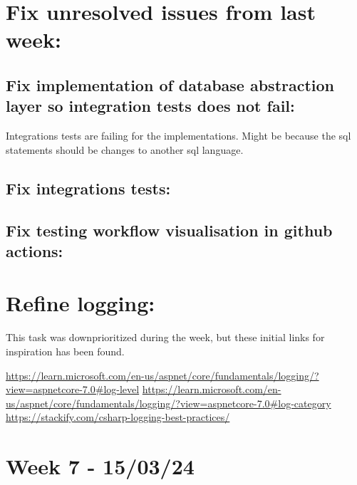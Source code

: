 
\section{Fix unresolved issues from last week:}
\label{log:fix-unresolved-issues-from-last-week}

\subsection{Fix implementation of database abstraction layer so integration tests does not fail:}
\label{log:fix-implementation-of-database-abstraction-layer-so-integration-tests-does-not-fail}

Integrations tests are failing for the implementations. Might be because
the sql statements should be changes to another sql language.

\subsection{Fix integrations tests:}
\label{log:fix-integrations-tests}

\subsection{Fix testing workflow visualisation in github actions:}
\label{log:fix-testing-workflow-visualisation-in-github-actions}

\section{Refine logging:}
\label{log:refine-logging}

This task was downprioritized during the week, but these initial links
for inspiration has been found.

\url{https://learn.microsoft.com/en-us/aspnet/core/fundamentals/logging/?view=aspnetcore-7.0\#log-level}
\url{https://learn.microsoft.com/en-us/aspnet/core/fundamentals/logging/?view=aspnetcore-7.0\#log-category}
\url{https://stackify.com/csharp-logging-best-practices/}

\section{Week 7 - 15/03/24}
\label{log:week7}

